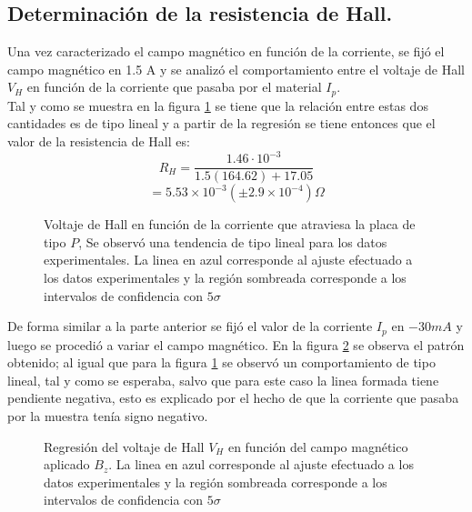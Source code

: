 \documentclass[%
 reprint,
 amsmath,amssymb,
 aps,
]{revtex4-1}
\begin{document}
\subsection{Determinación de la resistencia de Hall.}
Una vez caracterizado el campo magnético en función de la corriente, se fijó el campo magnético en 1.5 A y se analizó el comportamiento entre el voltaje de Hall $V_H$ en función de la corriente que pasaba por el material $I_p$.\\
Tal y como se muestra en la figura \ref{V_H_vs_I_p} se tiene que la relación entre estas dos cantidades es de tipo lineal y a partir de la regresión se tiene entonces que el valor de la resistencia de Hall es:
\[R_H=\frac{1.46\cdot 10^{-3}}{1.5(164.62)+17.05}\]
\[=5.53\times 10^{-3} (\pm 2.9\times 10^{-4}) \Omega\]
\begin{figure}[h!]
\caption{\label{V_H_vs_I_p}Voltaje de Hall en función de la corriente que atraviesa la placa de tipo $P$, Se observó una tendencia de tipo lineal para los datos experimentales. La linea en azul corresponde al ajuste efectuado a los datos experimentales y la región sombreada corresponde a los intervalos de confidencia con $5\sigma$}
\end{figure}

 De forma similar a la parte anterior se fijó el valor de la corriente $I_p$ en $-30 mA$ y luego se procedió a variar el campo magnético. En la figura \ref{V_H_vs_campo}  se observa el patrón obtenido; al igual que para la figura \ref{V_H_vs_I_p} se observó un comportamiento de tipo lineal, tal y como se esperaba, salvo que para este caso la linea formada tiene pendiente negativa, esto es explicado por el hecho de que la corriente que pasaba por la muestra tenía signo negativo.
\begin{figure}[h!]
\caption{\label{V_H_vs_campo}Regresión del voltaje de Hall $V_H$ en función del campo magnético aplicado $B_z$.  La linea en azul corresponde al ajuste efectuado a los datos experimentales y la región sombreada corresponde a los intervalos de confidencia con $5\sigma$}
\end{figure}
\end{document}
